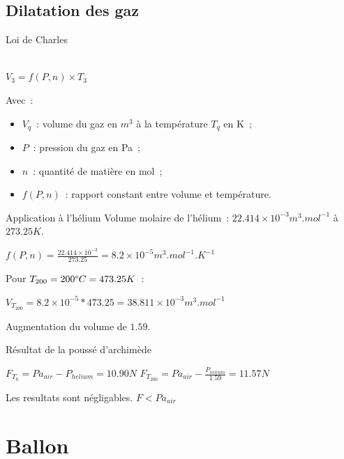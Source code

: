 \subsection{Dilatation des gaz}

\begin{frame}{Loi de Charles}
  \begin{center}
     \\
    $\displaystyle{V_3 = f(P, n) \times T_3}$
  \end{center}
  Avec~:
  \begin{itemize}
    \item $V_q$~: volume du gaz en $m^3$ à la température $T_q$ en K~;
    \item $P$~: pression du gaz en Pa~;
    \item $n$~: quantité de matière en mol~;
    \item $f(P, n)$~: rapport constant entre volume et température.
  \end{itemize}
\end{frame}

\begin{frame}{Application à l'hélium}
  Volume molaire de l'hélium~: $22.414\times 10^{-3} m^3.mol^{-1}$ à $273.25K$.
  \begin{center}
    $\displaystyle{f(P, n) = \frac{22.414\times 10^{-3}}{273.25} = 8.2\times 10^{-5} m^3.mol^{-1}.K^{-1}}$
  \end{center}
  Pour $T_{200} = 200 \degree C = 473.25 K$~:
  \begin{center}
    $\displaystyle{V_{T_{200}} = 8.2\times 10^{-5} * 473.25 = 38.811 \times 10^{-3}} m^3.mol^{-1}$
  \end{center}
  Augmentation du volume de $1.59$.
\end{frame}

\begin{frame}{Résultat de la poussé d'archimède}
  \begin{center}
    $\displaystyle{F_{T_0} = Pa_{air} - P_{helium} = 10.90 N}$
    \bigbreak
    $\displaystyle{F_{T_{200}} = Pa_{air} - \frac{P_{helium}}{1.59} = 11.57 N}$ \\
  \end{center}
  Les resultats sont négligables. $F < Pa_{air}$
\end{frame}


\section{Ballon}

